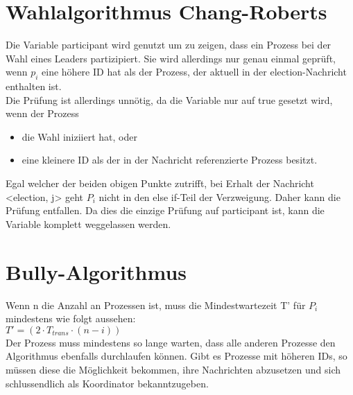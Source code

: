 \documentclass[a4paper,9pt]{article}
\begin{document}
\section{Wahlalgorithmus Chang-Roberts}
Die Variable participant wird genutzt um zu zeigen, dass ein Prozess bei der Wahl eines Leaders partizipiert. Sie wird allerdings nur genau einmal gepr\"uft, wenn $p_{i}$ eine h\"ohere ID hat als der Prozess, der aktuell in der election-Nachricht enthalten ist. \\
Die Pr\"ufung ist allerdings unn\"otig, da die Variable nur auf true gesetzt wird, wenn der Prozess
\begin{itemize}
\item die Wahl iniziiert hat, oder
\item eine kleinere ID als der in der Nachricht referenzierte Prozess besitzt.
\end{itemize}
Egal welcher der beiden obigen Punkte zutrifft, bei Erhalt der Nachricht \\
<election, j> geht $P_{i}$ nicht in den else if-Teil der Verzweigung. Daher kann die Pr\"ufung entfallen. Da dies die einzige Pr\"ufung auf participant ist, kann die Variable komplett weggelassen werden.

\section{Bully-Algorithmus}
Wenn n die Anzahl an Prozessen ist, muss die Mindestwartezeit T' f\"ur $P_{i}$ mindestens wie folgt aussehen: \\
$T' = (2 \cdot T_{trans} \cdot (n-i))$ \\
Der Prozess muss mindestens so lange warten, dass alle anderen Prozesse den Algorithmus ebenfalls durchlaufen k\"onnen. Gibt es Prozesse mit h\"oheren IDs, so m\"ussen diese die M\"oglichkeit bekommen, ihre Nachrichten abzusetzen und sich schlussendlich als Koordinator bekanntzugeben.
\end{document}
